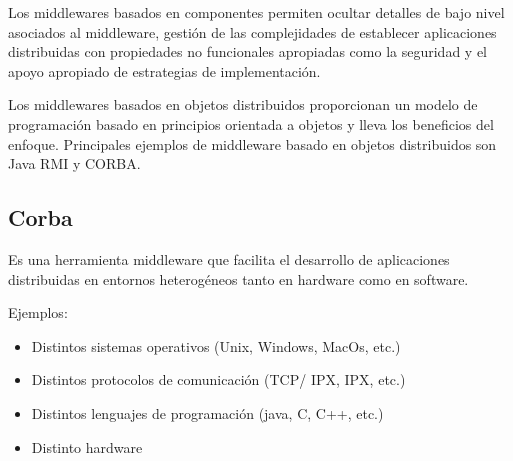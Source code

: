 Los middlewares basados en componentes permiten ocultar detalles de bajo nivel asociados al middleware, gestión de las complejidades de establecer aplicaciones distribuidas con propiedades no funcionales apropiadas como la seguridad y el apoyo apropiado de estrategias de implementación.

Los middlewares basados en objetos distribuidos proporcionan un modelo de programación basado en principios orientada a objetos y lleva los beneficios del enfoque. Principales ejemplos de middleware basado en objetos distribuidos son Java RMI y CORBA.

\begin{center}
\subsection{Corba}
\end{center}

Es una herramienta middleware que facilita el desarrollo de aplicaciones distribuidas en entornos heterogéneos tanto en hardware como en software.\hfill \break

Ejemplos:

\begin{itemize}
	\item Distintos sistemas operativos (Unix, Windows, MacOs, etc.)
	\item Distintos protocolos de comunicación (TCP/ IPX, IPX, etc.)
	\item Distintos lenguajes de programación (java, C, C++, etc.)
	\item Distinto hardware
\end{itemize}

